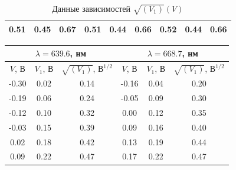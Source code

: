 \begin{enumerate}
\begin{table}[H]
\begin{tabular}{|ccc|ccc|ccc|}
                \multicolumn{1}{|c|}{0.51}   & \multicolumn{1}{c|}{0.45}     & 0.67                             & \multicolumn{1}{c|}{0.51}   & \multicolumn{1}{c|}{0.44}     & 0.66                             & \multicolumn{1}{c|}{0.52}   & \multicolumn{1}{c|}{0.44}     & 0.66                             \\ \hline
            \end{tabular}
            \caption{Данные зависимостей $\sqrt{(V_1)}(V)$}
        \end{table}

        \begin{table}[H]
            \centering
            \begin{tabular}{|ccc|ccc|}
                \hline
                \multicolumn{3}{|c|}{$\lambda = 639.6$, нм}                                                     & \multicolumn{3}{c|}{$\lambda = 668.7$, нм}                                                     \\ \hline
                \multicolumn{1}{|c|}{$V$, В} & \multicolumn{1}{c|}{$V_1$, В} & $\sqrt{(V_1)}$, $\text{В}^{1/2}$ & \multicolumn{1}{c|}{$V$, В} & \multicolumn{1}{c|}{$V_1$, В} & $\sqrt{(V_1)}$, $\text{В}^{1/2}$ \\ \hline
                \multicolumn{1}{|c|}{-0.30}  & \multicolumn{1}{c|}{0.02}     & 0.14                             & \multicolumn{1}{c|}{-0.16}  & \multicolumn{1}{c|}{0.04}     & 0.20                             \\ \hline
                \multicolumn{1}{|c|}{-0.19}  & \multicolumn{1}{c|}{0.06}     & 0.24                             & \multicolumn{1}{c|}{-0.05}  & \multicolumn{1}{c|}{0.09}     & 0.30                             \\ \hline
                \multicolumn{1}{|c|}{-0.12}  & \multicolumn{1}{c|}{0.10}     & 0.32                             & \multicolumn{1}{c|}{0.00}   & \multicolumn{1}{c|}{0.12}     & 0.35                             \\ \hline
                \multicolumn{1}{|c|}{-0.03}  & \multicolumn{1}{c|}{0.15}     & 0.39                             & \multicolumn{1}{c|}{0.09}   & \multicolumn{1}{c|}{0.16}     & 0.40                             \\ \hline
                \multicolumn{1}{|c|}{0.02}   & \multicolumn{1}{c|}{0.18}     & 0.42                             & \multicolumn{1}{c|}{0.13}   & \multicolumn{1}{c|}{0.19}     & 0.44                             \\ \hline
                \multicolumn{1}{|c|}{0.09}   & \multicolumn{1}{c|}{0.22}     & 0.47                             & \multicolumn{1}{c|}{0.17}   & \multicolumn{1}{c|}{0.22}     & 0.47                             \\ \hline

\end{tabular}
\end{table}
\end{enumerate}
